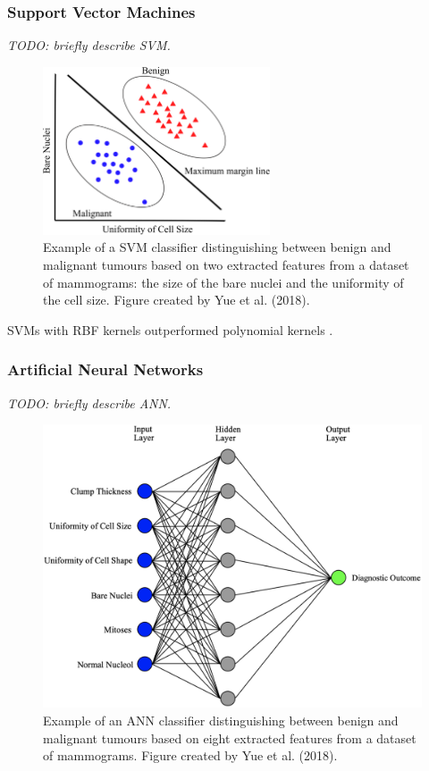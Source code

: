 \subsubsection{Support Vector Machines}

\textit{TODO: briefly describe SVM.}\\

\begin{figure}[ht]
\centerline{\includegraphics[width=0.6\textwidth]{Dissertation/figures/litsurvey/svm.png}}
\caption{\label{fig:litsurvey-svm-example}Example of a SVM classifier distinguishing between benign and malignant tumours based on two extracted features from a dataset of mammograms: the size of the bare nuclei and the uniformity of the cell size. Figure created by Yue et al. (2018).}
\end{figure}

SVMs with RBF kernels outperformed polynomial kernels \cite{Osareh2010}.

\subsubsection{Artificial Neural Networks}

\textit{TODO: briefly describe ANN.}

\begin{figure}[ht]
\centerline{\includegraphics[width=\textwidth]{Dissertation/figures/litsurvey/ann.png}}
\caption{\label{fig:litsurvey-ann-example}Example of an ANN classifier distinguishing between benign and malignant tumours based on eight extracted features from a dataset of mammograms. Figure created by Yue et al. (2018).}
\end{figure}

